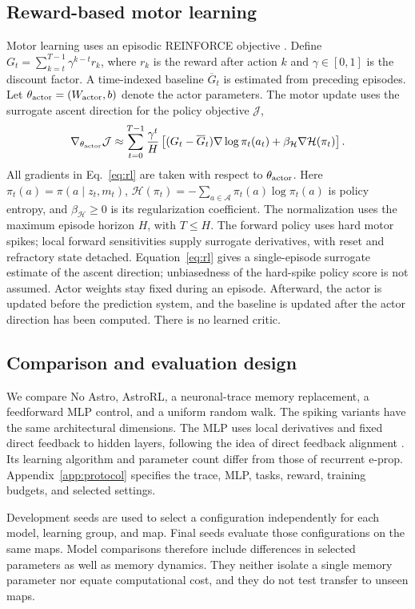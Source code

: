 \subsection{Reward-based motor learning}
Motor learning uses an episodic REINFORCE objective \cite{williams1992}. Define $G_t=\sum_{k=t}^{T-1}\gamma^{k-t}r_k$, where $r_k$ is the reward after action $k$ and $\gamma\in[0,1]$ is the discount factor. A time-indexed baseline $\overline G_t$ is estimated from preceding episodes. Let $\theta_{\rm actor}=(W_{\rm actor},b)$ denote the actor parameters. The motor update uses the surrogate ascent direction for the policy objective $\mathcal J$,
\begin{equation}
 \nabla_{\theta_{\rm actor}}\mathcal J\approx
 \sum_{t=0}^{T-1}\frac{\gamma^t}{H}
 \left[(G_t-\overline G_t)\nabla\log\pi_t(a_t)
 +\beta_{\mathcal H}\nabla\mathcal H(\pi_t)\right].
 \label{eq:rl}
\end{equation}
All gradients in Eq.~\ref{eq:rl} are taken with respect to $\theta_{\rm actor}$. Here $\pi_t(a)=\pi(a\mid z_t,m_t)$, $\mathcal H(\pi_t)=-\sum_{a\in\mathcal A}\pi_t(a)\log\pi_t(a)$ is policy entropy, and $\beta_{\mathcal H}\geq0$ is its regularization coefficient. The normalization uses the maximum episode horizon $H$, with $T\leq H$. The forward policy uses hard motor spikes; local forward sensitivities supply surrogate derivatives, with reset and refractory state detached. Equation~\ref{eq:rl} gives a single-episode surrogate estimate of the ascent direction; unbiasedness of the hard-spike policy score is not assumed. Actor weights stay fixed during an episode. Afterward, the actor is updated before the prediction system, and the baseline is updated after the actor direction has been computed. There is no learned critic.

\subsection{Comparison and evaluation design}
We compare No Astro, AstroRL, a neuronal-trace memory replacement, a feedforward MLP control, and a uniform random walk. The spiking variants have the same architectural dimensions. The MLP uses local derivatives and fixed direct feedback to hidden layers, following the idea of direct feedback alignment \cite{nokland2016}. Its learning algorithm and parameter count differ from those of recurrent e-prop. Appendix~\ref{app:protocol} specifies the trace, MLP, tasks, reward, training budgets, and selected settings.

Development seeds are used to select a configuration independently for each model, learning group, and map. Final seeds evaluate those configurations on the same maps. Model comparisons therefore include differences in selected parameters as well as memory dynamics. They neither isolate a single memory parameter nor equate computational cost, and they do not test transfer to unseen maps.

